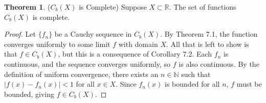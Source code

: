 \documentclass{article}
\newcommand{\N}{\mathbb{N}}
\newcommand{\R}{\mathbb{R}}
\theoremstyle{definition}
\newtheorem{theorem}{Theorem}[section]
\begin{document}
	\begin{theorem}($ C_b(X) $ is Complete)
		Suppose $ X\subset \R $. The set of functions $ C_b(X) $ is complete. 
	\end{theorem}
	\begin{proof}
		Let $ \{f_n\} $ be a Cauchy sequence in $ C_b(X) $. By Theorem 7.1, the function converges uniformly to some limit $ f $ with domain $ X $. All that is left to show is that $ f\in C_b(X) $, but this is a consequence of Corollary 7.2. Each $ f_n $ is continuous, and the sequence converges uniformly, so $ f $ is also continuous. By the definition of uniform convergence, there exists an $ n\in\N $ such that $ |f(x)-f_n(x)|<1 $ for all $ x\in X $. Since $ f_n(x) $ is bounded for all $ n $, $ f $ must be bounded, giving $ f\in C_b(X) $. 
	\end{proof}
	
\end{document}
